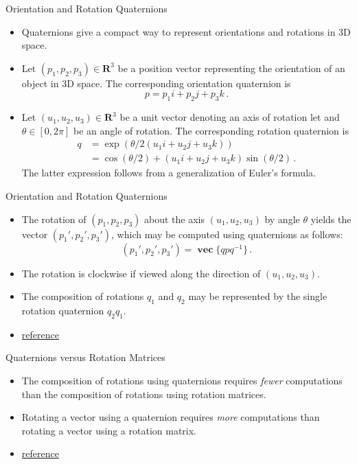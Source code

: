 \documentclass{beamer}
\newcommand{\real}{\mathbf{R}}
\DeclareMathOperator{\qvec}{\mathbf{vec}}
\newcommand{\myemph}[1]{\emph{#1}}
\begin{document}
\begin{frame}{Orientation and Rotation Quaternions}
\begin{itemize}
\item Quaternions give a compact way to represent orientations and rotations in 3D space.
\item Let $(p_1,p_2,p_3) \in \real^3$ be a position vector representing the orientation of an object in 3D space. The corresponding orientation quaternion is
\begin{equation*}
p = p_1i+p_2j+p_3k\,.
\end{equation*}
\item Let $(u_1,u_2,u_3) \in \real^3$ be a unit vector denoting an axis of rotation let and $\theta \in [0,2\pi]$ be an angle of rotation. The corresponding rotation quaternion is 
\begin{equation*}
\begin{aligned}
q &= \exp(\theta/2(u_1i+u_2j+u_3k))\\
& = \cos(\theta/2) + (u_1i+u_2j+u_3k)\sin(\theta/2)\,.
\end{aligned}
\end{equation*}
The latter expression follows from a generalization of Euler's formula.
\end{itemize}
\end{frame}

\begin{frame}{Orientation and Rotation Quaternions}
\begin{itemize}
\item The rotation of $(p_1,p_2,p_3)$ about the axis $(u_1,u_2,u_3)$ by angle $\theta$ yields the vector $(p_1',p_2',p_3')$, which may be computed using quaternions as follows:
\begin{equation*}
(p_1',p_2',p_3') = \qvec\lbrace qpq^{-1} \rbrace\,.
\end{equation*}
\item The rotation is clockwise if viewed along the direction of $(u_1,u_2,u_3)$.
\item The composition of rotations $q_1$ and $q_2$ may be represented by the single rotation quaternion $q_2q_1$.
\item \href{https://en.wikipedia.org/wiki/Quaternions_and_spatial_rotation}{reference}
\end{itemize}
\end{frame}

\begin{frame}{Quaternions versus Rotation Matrices}
\begin{itemize}
\item The composition of rotations using quaternions requires \myemph{fewer} computations than the composition of rotations using rotation matrices.
\item Rotating a vector using a quaternion requires \myemph{more} computations than rotating a vector using a rotation matrix.
\item \href{https://people.csail.mit.edu/bkph/articles/Quaternions.pdf}{reference}
\end{itemize}
\end{frame}
\end{document}
